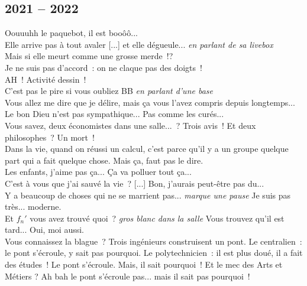 \documentclass[french, a4paper, openany]{book}
\begin{document}
	\subsection*{2021 -- 2022}
		\noindent \og Oouuuhh le paquebot, il est booôô... \fg \\
		\og Elle arrive pas à tout avaler [...] et elle dégueule... \fg \emph{en parlant de sa livebox} \\
		\og Mais si elle meurt comme une grosse merde~!? \fg \\
		\og Je ne suis pas d'accord~: on ne claque pas des doigts~! \fg \\
		\og AH~! Activité dessin~! \fg \\
		\og C'est pas le pire si vous oubliez BB \fg \emph{en parlant d'une base} \\
		\og Vous allez me dire que je délire, mais ça vous l'avez compris depuis longtemps... \fg \\
		\og Le bon Dieu n'est pas sympathique... Pas comme les curés... \fg \\
		\og Vous savez, deux économistes dans une salle...~? Trois avis~! Et deux philosophes~? Un mort~! \fg \\
		\og Dans la vie, quand on réussi un calcul, c'est parce qu'il y a un groupe quelque part qui a fait quelque chose. Mais ça, faut pas le dire. \fg \\
		\og Les enfants, j'aime pas ça... Ça va polluer tout ça... \fg \\
		\og C'est à vous que j'ai sauvé la vie~? [...] Bon, j'aurais peut-être pas du... \fg \\
		\og Y a beaucoup de choses qui ne se marrient pas... \emph{marque une pause} Je suis pas très... moderne. \fg \\
		\og Et $f_n'$ vous avez trouvé quoi~? \emph{gros blanc dans la salle} Vous trouvez qu'il est tard... Oui, moi aussi. \fg \\
		\og Vous connaissez la blague~? Trois ingénieurs construisent un pont. Le centralien~: le pont s'écroule, y sait pas pourquoi. Le polytechnicien~: il est plus doué, il a fait des études~! Le pont s'écroule. Mais, il sait pourquoi~! Et le mec des Arts et Métiers ? Ah bah le pont s'écroule pas... mais il sait pas pourquoi~! \fg \\
		
\end{document}
